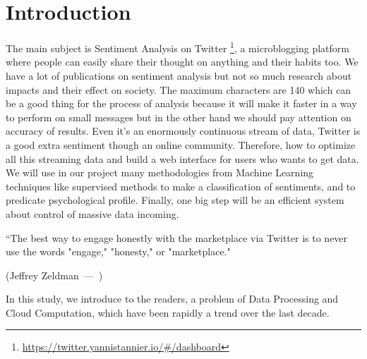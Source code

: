 \documentclass{acmtog} %
\let\oldquote\quote
\let\endoldquote\endquote
\renewenvironment{quote}[2][]
  {\if\relax\detokenize{#1}\relax
     \def\quoteauthor{#2}%
   \else
     \def\quoteauthor{#2~---~#1}%
   \fi
   \oldquote}
  {\par\nobreak\smallskip\hfill(\quoteauthor)%
   \endoldquote\addvspace{\bigskipamount}}
\begin{document}
\section{Introduction}

The main subject is Sentiment Analysis on Twitter \footnote{\url{https://twitter.yannistannier.io/\#/dashboard}}, a microblogging platform where people can easily share their thought on anything and their habits too. We have a lot of publications on sentiment analysis but not so much research about impacts and their effect on society. The maximum characters are 140 which can be a good thing for the process of analysis because it will make it faster in a way to perform on small messages but in the other hand we should pay attention on accuracy of results. Even it's an enormously continuous stream of data, Twitter is a good extra sentiment though an online community. Therefore, how to optimize all this streaming data and build a web interface for users who wants to get data. We will use in our project many methodologies from Machine Learning techniques like supervised methods to make a classification of sentiments, and to predicate psychological profile. Finally, one big  step will be an efficient system about control of massive data incoming.
 
\begin{quote}{Jeffrey Zeldman}
“The best way to engage honestly with the marketplace via Twitter is to never use the words "engage," "honesty," or "marketplace." 
\end{quote}

In this study, we introduce to the readers, a problem of Data Processing and Cloud Computation, which have been rapidly a trend over the last decade. 
\end{document}
